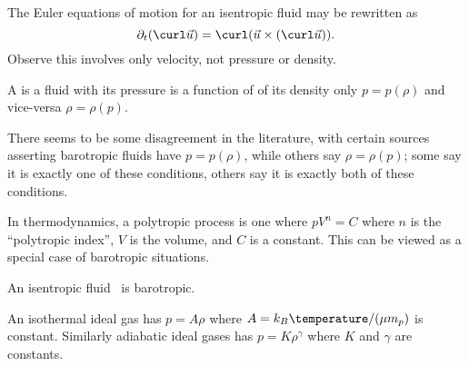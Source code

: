 \begin{node}
\begin{theorem}\label{fluids:euler-flow-000K}%
The Euler equations of motion for an isentropic fluid may be rewritten
as
\begin{equation*}
\partial_{t}(\curl\vec{u})=\curl(\vec{u}\times(\curl\vec{u})).
\end{equation*}
Observe this involves only velocity, not pressure or density.
\end{theorem} %

\begin{definition}\label{fluids:euler-flow-000X}%
A  is a fluid with its pressure is a function of
of its density only $p=p(\rho)$ and vice-versa $\rho=\rho(p)$.

\begin{node}[Caution]\label{fluids:euler-flow-0011}%
There seems to be some disagreement in the literature, with certain
sources asserting barotropic fluids have $p=p(\rho)$, while others say
$\rho=\rho(p)$; some say it is exactly one of these conditions, others
say it is exactly both of these conditions.

In thermodynamics, a polytropic process is one where $pV^{n}=C$ where
$n$ is the ``polytropic index'', $V$ is the volume, and $C$ is a
constant. This can be viewed as a special case of barotropic situations.
\end{node}

\begin{example}\label{fluids:euler-flow-000Y}%
An isentropic fluid~ is barotropic.
\end{example}

\begin{example}\label{fluids:euler-flow-0010}%
An isothermal ideal gas has $p=A\rho$ where $A=k_{B}\temperature/(\mu m_{p})$ is constant.
Similarly adiabatic ideal gases has $p=K\rho^{\gamma}$ where $K$ and
$\gamma$ are constants.
\end{example}


\end{definition}
\end{node}
